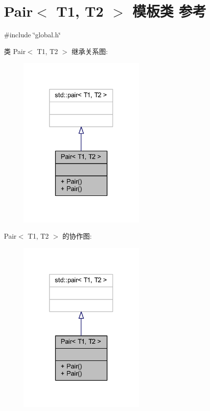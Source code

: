 \hypertarget{classPair}{}\section{Pair$<$ T1, T2 $>$ 模板类 参考}
\label{classPair}


{\ttfamily \#include \char`\"{}global.\+h\char`\"{}}



类 Pair$<$ T1, T2 $>$ 继承关系图\+:
\nopagebreak
\begin{figure}[H]
\begin{center}
\leavevmode
\includegraphics[width=177pt]{classPair__inherit__graph}
\end{center}
\end{figure}


Pair$<$ T1, T2 $>$ 的协作图\+:
\nopagebreak
\begin{figure}[H]
\begin{center}
\leavevmode
\includegraphics[width=177pt]{classPair__coll__graph}
\end{center}
\end{figure}
